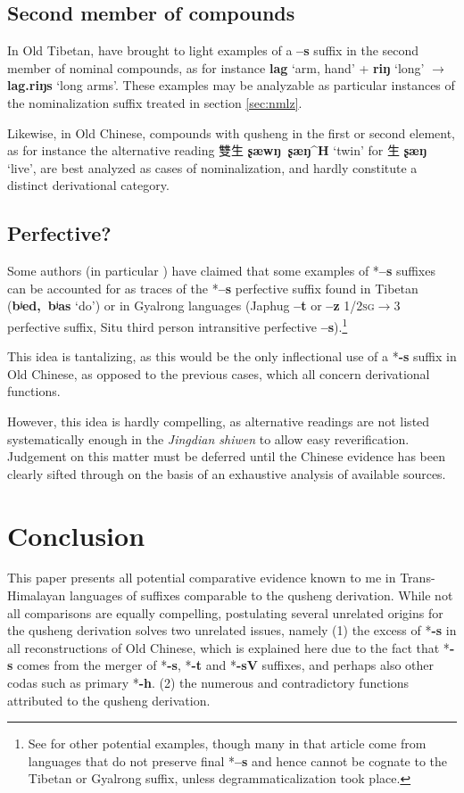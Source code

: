\documentclass[oneside,a4paper,11pt]{article}
\newcommand{\ipa}[1]{{\phon\textbf{\mbox{#1}}}}
\newcommand{\zh}[1]{{\cn#1}}
\newcommand{\ch}[3]{\zh{#1} \ipa{#2} `#3'}
\begin{document}
\subsection{Second member of compounds}
In Old Tibetan, \citet{uebach08rjeblas} have brought to light examples of a \ipa{--s} suffix in the second member of nominal compounds, as for instance \ipa{lag} `arm, hand' + \ipa{riŋ} `long' $\rightarrow$ \ipa{lag.riŋs} `long arms'. These examples may be analyzable as particular instances of the nominalization suffix treated in section \ref{sec:nmlz}.

Likewise, in Old Chinese, compounds with qusheng in the first or second element, as for instance the alternative reading \ch{雙生}{ʂæwŋ ʂæŋ^H}{twin} for \ch{生}{ʂæŋ}{live}, are best analyzed as cases of nominalization, and hardly constitute a distinct derivational category.
 
\subsection{Perfective?} \label{sec:perf}
Some authors (in particular \citealt{jinlx06}) have claimed that some examples of *\ipa{--s} suffixes can be accounted for as traces of the *\ipa{--s} perfective suffix found in Tibetan (\ipa{bʲed, bʲas} `do') or in Gyalrong languages (Japhug \ipa{--t} or \ipa{--z} \textsc{1/2sg}$\rightarrow$3 perfective suffix, Situ third person intransitive perfective \ipa{--s}).\footnote{See \citet{huangbf97s.houzhui} for other potential examples, though many in that article come from languages that do not preserve final *\ipa{--s} and hence cannot be cognate to the Tibetan or Gyalrong suffix, unless degrammaticalization took place.}

This idea is tantalizing, as this would be the only inflectional use of a *\ipa{-s} suffix in Old Chinese, as opposed to the previous cases, which all concern derivational functions.

However, this idea is hardly compelling, as alternative readings are not listed systematically enough in the \textit{Jingdian shiwen} to allow easy reverification. Judgement on this matter must be deferred until the Chinese evidence has been clearly sifted through on the basis of an exhaustive analysis of available sources.

\section{Conclusion}
This paper presents all potential comparative evidence known to me in Trans-Himalayan languages of suffixes comparable to the qusheng derivation. While not all comparisons are equally compelling, postulating several unrelated origins for the qusheng derivation solves two unrelated issues, namely (1) the excess of *\ipa{-s} in all reconstructions of Old Chinese, which is explained here due to the fact that *\ipa{-s} comes from the merger of *\ipa{-s}, *\ipa{-t} and *\ipa{-sV} suffixes, and perhaps also other codas such as primary *\ipa{-h}. (2) the numerous and contradictory functions attributed to the qusheng derivation.
\end{document}
